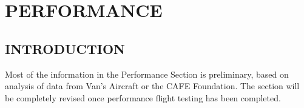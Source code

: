 \chapter{PERFORMANCE}
\label{perf-sec-number}
\vspace{\minitocspacebefore}
\minitoc
\cleardoublepage

\renewcommand{\textfraction}{0.0} 
\renewcommand{\topfraction}{1} 
\renewcommand{\bottomfraction}{1} 
\renewcommand{\floatpagefraction}{0.35} 
\setcounter{totalnumber}{5} 

\section{INTRODUCTION}
Most of the information in the Performance Section is preliminary, based on analysis of
 data from Van's Aircraft or the CAFE Foundation.
The section will be completely revised once performance flight testing has been completed.
\clearpage


